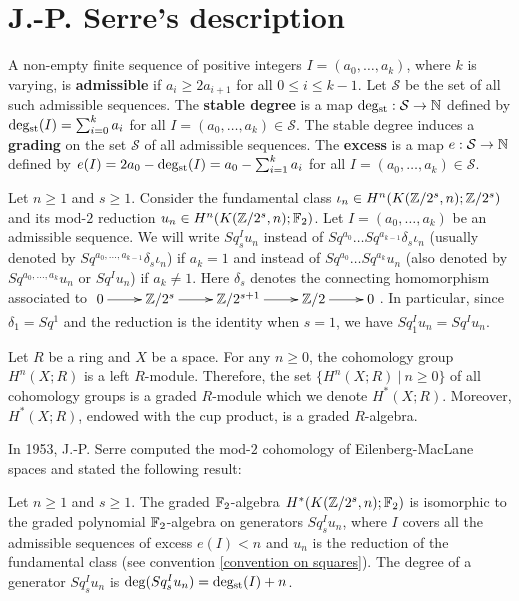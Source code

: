 \section{J.-P. Serre's description}\label{s:Serre's description}

\begin{defn}
A non-empty finite sequence of positive integers $I=(a_0,\dots,a_k)$, where $k$ is varying, is {\bf admissible} if $a_i\geq2a_{i+1}$ for all $0\leq i\leq k-1$. Let $\mathcal S$ be the set of all such admissible sequences. The {\bf stable degree} is a map $\operatorname{deg_{st}}:{\mathcal S}\to\mathbb{N}$ defined by $\operatorname{deg_{st}}(I)=\sum_{i=0}^k a_i$ for all $I=(a_0,\dots,a_k)\in{\mathcal S}$. The stable degree induces a {\bf grading} on the set $\mathcal S$ of all admissible sequences. The {\bf excess} is a map $e:{\mathcal S}\to\mathbb{N}$ defined by $e(I)=2a_0-\operatorname{deg_{st}}(I)=a_0-\sum_{i=1}^k a_i$ for all $I=(a_0,\dots,a_k)\in{\mathcal S}$.
\end{defn}

\begin{conv}\label{convention on squares}
Let $n\geq1$ and $s\geq1$. Consider the fundamental class $\iota_n\in H^n(K(\mathbb{Z}/2^s,n);\mathbb{Z}/2^s)$ and its mod-$2$ reduction $u_n\in H^n(K(\mathbb{Z}/2^s,n);\mathbb{F}_2)$. Let $I=(a_0,\dots,a_k)$ be an admissible sequence. We will write $Sq^I_s u_n$ instead of $Sq^{a_0}\dots Sq^{a_{k-1}}\delta_s\iota_n$ (usually denoted by $Sq^{a_0,\dots,a_{k-1}}\delta_s\iota_n$) if $a_k=1$ and instead of $Sq^{a_0}\dots Sq^{a_k} u_n$ (also denoted by $Sq^{a_0,\dots,a_k} u_n$ or $Sq^I u_n$) if $a_k\not=1$. Here $\delta_s$ denotes the connecting homomorphism associated to $\xymatrix{0\ar[r] &\Z/2^s\ar[r] &\Z/2^{s+1}\ar[r] &\Z/2\ar[r] &0}$. In particular, since $\delta_1=Sq^1$ and the reduction is the identity when $s=1$, we have $Sq^I_1 u_n=Sq^I u_n$.
\end{conv}

Let $R$ be a ring and $X$ be a space. For any $n\geq0$, the cohomology group $H^n(X;R)$ is a left $R$-module. Therefore, the set $\{H^n(X;R)\ |\ n\geq0\}$ of all cohomology groups is a graded $R$-module which we denote $H^*(X;R)$. Moreover, $H^*(X;R)$, endowed with the cup product, is a graded $R$-algebra.

\medskip
In 1953, J.-P. Serre computed the mod-$2$ cohomology of Eilenberg-MacLane spaces and stated the following result:

\begin{thm}\label{t:Serre's description}
Let $n\geq1$ and $s\geq1$. The graded $\mathbb{F}_2$-algebra $H^*(K(\mathbb{Z}/2^s,n);\mathbb{F}_2)$ is isomorphic to the graded polynomial $\mathbb{F}_2$-algebra on generators $Sq^I_s u_n$, where $I$ covers all the admissible sequences of excess $e(I)<n$ and $u_n$ is the reduction of the fundamental class (see convention \ref{convention on squares}). The degree of a generator $Sq^I_s u_n$ is $\deg(Sq^I_s u_n)=\operatorname{deg_{st}}(I)+n$.
\end{thm}

